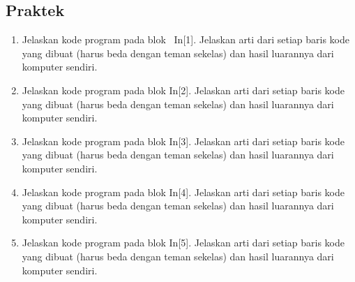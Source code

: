 \subsection{Praktek}
\begin{enumerate}
	\item Jelaskan kode program pada blok \ In[1]. Jelaskan arti dari setiap baris kode yang dibuat (harus beda dengan teman sekelas) dan hasil luarannya dari komputer sendiri.
	\hfill\break

	

	\item Jelaskan kode program pada blok  In[2]. Jelaskan arti dari setiap baris kode yang dibuat (harus beda dengan teman sekelas) dan hasil luarannya dari komputer sendiri.
	\hfill\break

	

	\item Jelaskan kode program pada blok  In[3]. Jelaskan arti dari setiap baris kode yang dibuat (harus beda dengan teman sekelas) dan hasil luarannya dari komputer sendiri.
	\hfill\break

	

	\item Jelaskan kode program pada blok  In[4]. Jelaskan arti dari setiap baris kode yang dibuat (harus beda dengan teman sekelas) dan hasil luarannya dari komputer sendiri.
	\hfill\break

	

	\item Jelaskan kode program pada blok  In[5]. Jelaskan arti dari setiap baris kode yang dibuat (harus beda dengan teman sekelas) dan hasil luarannya dari komputer sendiri.
	\hfill\break


\end{enumerate}
